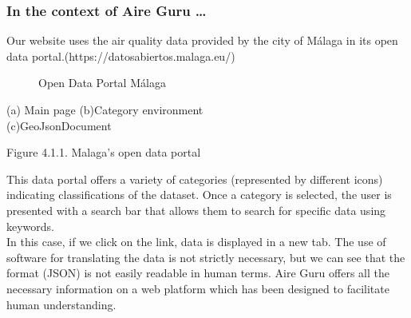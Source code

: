 \subsubsection*{In the context of Aire Guru \ldots} 

Our website uses the air quality data provided by the city of Málaga in its open data portal.(https://datosabiertos.malaga.eu/)\\

\begin{figure}[ht]
    \centering
    \hfill
    \vfill
    \caption{Open Data Portal Málaga}
\end{figure}


\begin{center}
    \bf{ (a) Main page     (b)Category environment\\
    (c)GeoJsonDocument
        
    Figure 4.1.1. Malaga's open data portal}
\end{center}

This data portal offers a variety of categories (represented by different icons) indicating classifications of the dataset.
Once a category is selected, the user is presented with a search bar that allows them to search for specific data using keywords.\\

In this case, if we click on the link, data is displayed in a new tab. The use of software
for translating the data is not strictly necessary, but we can see that the format (JSON) is not easily readable in human terms.
Aire Guru offers all the necessary information on a web platform which has been designed to facilitate human understanding. \\